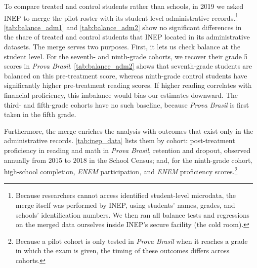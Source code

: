 To compare treated and control students rather than schools, in 2019 we asked INEP to merge the pilot roster with its student-level administrative records.\footnote{Because researchers cannot access identified student-level microdata, the merge itself was performed by INEP, using students' names, grades, and schools' identification numbers. We then ran all balance tests and regressions on the merged data ourselves inside INEP's secure facility (the cold room). }  \autoref{tab:balance_adm1} and \autoref{tab:balance_adm2} show no significant differences in the share of treated and control students that INEP located in its administrative datasets. The merge serves two purposes. First, it lets us check balance at the student level. For the seventh- and ninth-grade cohorts, we recover their grade 5 scores in \textit{Prova Brasil}. \autoref{tab:balance_adm2} shows that seventh-grade students are balanced on this pre-treatment score, whereas ninth-grade control students have significantly higher pre-treatment reading scores. If higher reading correlates with financial proficiency, this imbalance would bias our estimates downward. The third- and fifth-grade cohorts have no such baseline, because \textit{Prova Brasil} is first taken in the fifth grade.

Furthermore, the merge enriches the analysis with outcomes that exist only in the administrative records. \autoref{tab:inep_data} lists them by cohort: post-treatment proficiency in reading and math in \textit{Prova Brasil}, retention and dropout, observed annually from 2015 to 2018 in the School Census; and, for the ninth-grade cohort, high-school completion, \textit{\textit{ENEM}} participation, and \textit{ENEM} proficiency scores.\footnote{Because a pilot cohort is only tested in \textit{Prova Brasil} when it reaches a grade in which the exam is given, the timing of these outcomes differs across cohorts.}




